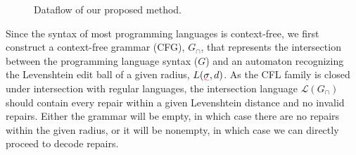 \documentclass[sigplan,review,acmsmall,nonacm,anonymous]{acmart}\settopmatter{printfolios=false,printccs=false,printacmref=false}
\begin{document}
\begin{wrapfigure}{r}{0.4\textwidth}
\begin{center}
{
      }
    \end{center}
    \vspace{-0.7cm}
    \caption{Dataflow of our proposed method.}\label{fig:flowchart}
    \vspace{-0.5cm}
  \end{wrapfigure}

  Since the syntax of most programming languages is context-free, we first construct a context-free grammar (CFG), $G_\cap$, that represents the intersection between the programming language syntax ($G$) and an automaton recognizing the Levenshtein edit ball of a given radius, $L(\err\sigma, d)$. As the CFL family is closed under intersection with regular languages, the intersection language $\mathcal{L}(G_\cap)$ should contain every repair within a given Levenshtein distance and no invalid repairs. Either the grammar will be empty, in which case there are no repairs within the given radius, or it will be nonempty, in which case we can directly proceed to decode repairs.
\end{document}
